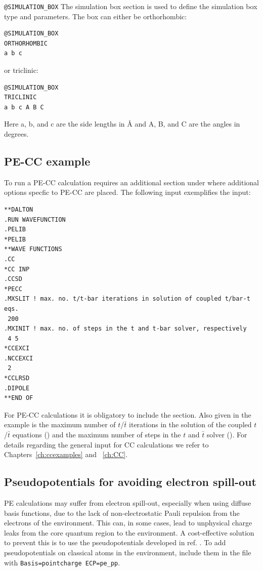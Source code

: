 \noindent\texttt{@SIMULATION\_BOX}\newline
The simulation box section is used to define the simulation box type and
parameters. The box can either be orthorhombic:
\begin{verbatim}
@SIMULATION_BOX
ORTHORHOMBIC
a b c
\end{verbatim}
or triclinic:
\begin{verbatim}
@SIMULATION_BOX
TRICLINIC
a b c A B C
\end{verbatim}
Here a, b, and c are the side lengths in \AA{} and A, B, and C are the angles in degrees.

\subsection*{PE-CC example}\label{subsec:pecc}
To run a PE-CC calculation requires an additional  section under
 where additional options specfic to PE-CC are placed.
The following input exemplifies the input:
\begin{verbatim}
**DALTON
.RUN WAVEFUNCTION
.PELIB
*PELIB
**WAVE FUNCTIONS
.CC
*CC INP
.CCSD
*PECC
.MXSLIT ! max. no. t/t-bar iterations in solution of coupled t/bar-t eqs.
 200
.MXINIT ! max. no. of steps in the t and t-bar solver, respectively
 4 5
*CCEXCI
.NCCEXCI
 2
*CCLRSD
.DIPOLE
**END OF
\end{verbatim}
For PE-CC calculations
it is obligatory to include the  section. Also given in the example
is the maximum number of $t$/$\bar{t}$ iterations in the solution of the
coupled $t$/$\bar{t}$ equations () and the maximum number of
steps in the $t$ and $\bar{t}$ solver (). For details regarding
the general input for CC calculations we refer to
Chapters~\ref{ch:ccexamples} and ~\ref{ch:CC}.

\subsection*{Pseudopotentials for avoiding electron spill-out}
PE calculations may suffer from electron spill-out, especially when using diffuse
basis functions, due to the lack of non-electrostatic Pauli repulsion from the electrons
of the environment. This can, in some cases, lead to unphysical charge leaks from
the core quantum region to the environment.
A cost-effective solution to prevent this is to use the pseudopotentials developed
in ref. .
To add pseudopotentials on classical atoms in the environment, include them in the \molinp file with
\texttt{Basis=pointcharge ECP=pe\_pp}.

